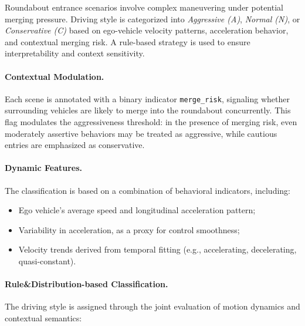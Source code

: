 \documentclass{article}
\begin{document}
Roundabout entrance scenarios involve complex maneuvering under potential merging pressure. Driving style is categorized into \textit{Aggressive (A)}, \textit{Normal (N)}, or \textit{Conservative (C)} based on ego-vehicle velocity patterns, acceleration behavior, and contextual merging risk. A rule-based strategy is used to ensure interpretability and context sensitivity.

\paragraph{Contextual Modulation.}
Each scene is annotated with a binary indicator \texttt{merge\_risk}, signaling whether surrounding vehicles are likely to merge into the roundabout concurrently. This flag modulates the aggressiveness threshold: in the presence of merging risk, even moderately assertive behaviors may be treated as aggressive, while cautious entries are emphasized as conservative.

\paragraph{Dynamic Features.}
The classification is based on a combination of behavioral indicators, including:
\begin{itemize}[leftmargin=1em, topsep=0pt, itemsep=0.3em]
    \item Ego vehicle's average speed and longitudinal acceleration pattern;
    \item Variability in acceleration, as a proxy for control smoothness;
    \item Velocity trends derived from temporal fitting (e.g., accelerating, decelerating, quasi-constant).
\end{itemize}

\paragraph{Rule\&Distribution-based Classification.}
The driving style is assigned through the joint evaluation of motion dynamics and contextual semantics:
\end{document}
